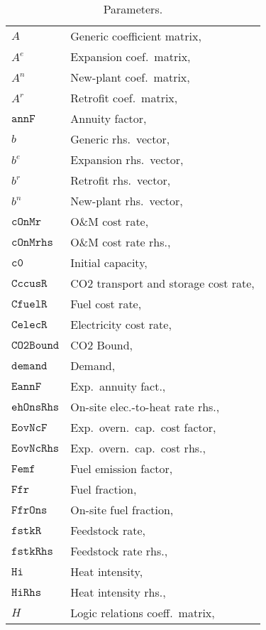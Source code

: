 \documentclass{amsart}
\begin{document}
%
\begin{longtable}[c]{@{}ll@{}}
    \caption{Parameters.}\label{tab:params} \\
    $A$ & Generic coefficient matrix,\\
    $A^e$	& Expansion coef.\ matrix, \\
    $A^n$	& New-plant coef.\ matrix, \\
    $A^r$	& Retrofit coef.\ matrix, \\
    $\mathtt{annF}$	& Annuity factor, \\
    $b$ & Generic rhs.\ vector,\\
    $b^e$	& Expansion rhs.\ vector, \\
    $b^r$	& Retrofit rhs.\ vector, \\
    $b^n$	& New-plant rhs.\ vector, \\
    $\mathtt{cOnMr}$	& O\&M cost rate, \\
    $\mathtt{cOnMrhs}$	& O\&M cost rate rhs., \\
    $\mathtt{c0}$	& Initial capacity, \\
    $\mathtt{CccusR}$ & CO2 transport and storage cost rate, \\
    $\mathtt{CfuelR}$ & Fuel cost rate, \\
    $\mathtt{CelecR}$ & Electricity cost rate, \\
    $\mathtt{CO2Bound}$ & CO2 Bound, \\
    $\mathtt{demand}$ & Demand, \\
    $\mathtt{EannF}$	& Exp.\ annuity fact., \\
    $\mathtt{ehOnsRhs}$	& On-site elec.-to-heat rate rhs., \\
    $\mathtt{EovNcF}$	& Exp.\ overn.\ cap.\ cost factor, \\
    $\mathtt{EovNcRhs}$	& Exp.\ overn.\ cap.\ cost rhs., \\
    $\mathtt{Femf}$	& Fuel emission factor, \\
    $\mathtt{Ffr}$	& Fuel fraction, \\
    $\mathtt{FfrOns}$	& On-site fuel fraction, \\
    $\mathtt{fstkR}$	& Feedstock rate, \\
    $\mathtt{fstkRhs}$	& Feedstock rate rhs., \\
    $\mathtt{Hi}$	& Heat intensity, \\
    $\mathtt{HiRhs}$	& Heat intensity rhs., \\
    $H$ & Logic relations coeff.\ matrix,\\

\end{longtable}
\end{document}
